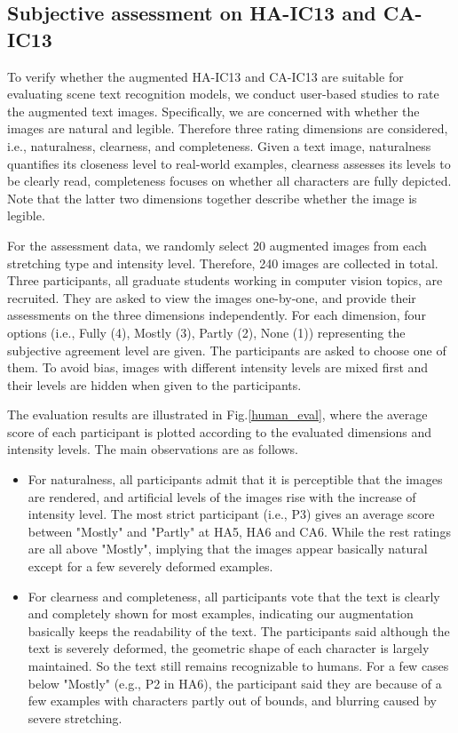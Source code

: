\subsection{Subjective assessment on HA-IC13 and CA-IC13}
To verify whether the augmented HA-IC13 and CA-IC13 are suitable for evaluating scene text recognition models, we conduct user-based studies to rate the augmented text images. Specifically, we are concerned with whether the images are natural and legible. Therefore three rating dimensions are considered, i.e., naturalness, clearness, and completeness. Given a text image, naturalness quantifies its closeness level to real-world examples, clearness assesses its levels to be clearly read, completeness focuses on whether all characters are fully depicted. Note that the latter two dimensions together describe whether the image is legible.

For the assessment data, we randomly select 20 augmented images from each stretching type and intensity level. Therefore, 240 images are collected in total. Three participants, all graduate students working in computer vision topics, are recruited. They are asked to view the images one-by-one, and provide their assessments on the three dimensions independently. For each dimension, four options (i.e., Fully (4), Mostly (3), Partly (2), None (1)) representing the subjective agreement level are given. The participants are asked to choose one of them. To avoid bias, images with different intensity levels are mixed first and their levels are hidden when given to the participants. 

The evaluation results are illustrated in Fig.\ref{human_eval}, where the average score of each participant is plotted according to the evaluated dimensions and intensity levels. The main observations are as follows. 
\begin{itemize}
    \item For naturalness, all participants admit that it is perceptible that the images are rendered, and artificial levels of the images rise with the increase of intensity level. The most strict participant (i.e., P3) gives an average score between "Mostly" and "Partly" at HA5, HA6 and CA6. While the rest ratings are all above "Mostly", implying that the images appear basically natural except for a few severely deformed examples.   
    \item For clearness and completeness, all participants vote that the text is clearly and completely shown for most examples, indicating our augmentation basically keeps the readability of the text. The participants said although the text is severely deformed, the geometric shape of each character is largely maintained. So the text still remains recognizable to humans. For a few cases below "Mostly" (e.g., P2 in HA6), the participant said they are because of a few examples with characters partly out of bounds, and blurring caused by severe stretching.
\end{itemize}

